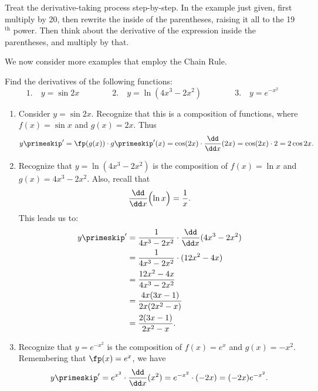 Treat the derivative-taking process step-by-step. In the example just given, first multiply by 20, then rewrite the inside of the parentheses, raising it all to the 19$^{\text{th}}$ power. Then think about the derivative of the expression inside the parentheses, and multiply by that.


We now consider more examples that employ the Chain Rule.

\begin{example}\label{ex_chain3}%
Find the derivatives of the following functions:
\[
 1.\quad y = \sin{2x}\qquad\qquad
 2.\quad y= \ln (4x^3-2x^2)\qquad\qquad
 3.\quad y = e^{-x^2}
\]
\solution
\begin{enumerate}
	\item	Consider $y = \sin 2x$. Recognize that this is a composition of functions, where $f(x) = \sin x$ and $g(x) = 2x$. Thus
	\[
	 y\primeskip' = \fp(g(x))\cdot g\primeskip'(x)
	 =\cos (2x) \cdot \frac{\dd}{\dd x}(2x)= \cos (2x)\cdot 2 = 2\cos 2x.
	\]
	\item	Recognize that $y = \ln (4x^3-2x^2)$ is the composition of $f(x) = \ln x$ and $g(x) = 4x^3-2x^2$. Also, recall that
	\[\frac{\dd}{\dd x}\Bigl(\ln x\Bigr) = \frac{1}{x}.\]
	This leads us to:
	\begin{align*}
	 y\primeskip'
	 & = \frac{1}{4x^3-2x^2} \cdot \frac{\dd}{\dd x} (4x^3-2x^2) \\
	 & = \frac{1}{4x^3-2x^2} \cdot (12x^2-4x) \\
	 & = \frac{12x^2-4x}{4x^3-2x^2} \\
	 & = \frac{4x(3x-1)}{2x(2x^2-x)} \\
	 & = \frac{2(3x-1)}{2x^2-x}.
	\end{align*}
	\item	Recognize  that $y = e^{-x^2}$ is the composition of $f(x) = e^x$ and $g(x) = -x^2$. Remembering that $\fp(x) = e^x$, we have
	\[
	 y\primeskip'=e^{x^2}\cdot\frac{\dd}{\dd x}(x^2)=e^{-x^2}\cdot(-2x)=(-2x)e^{-x^2}.
	\]
\end{enumerate}
\end{example}

